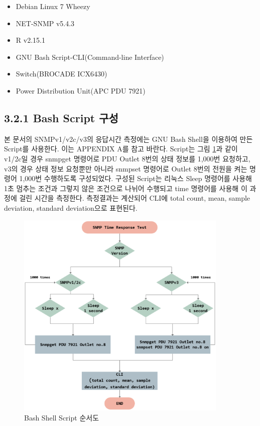\documentclass[11pt
  , a4paper
  , article
  , oneside
]{memoir}
\begin{document}
\begin{itemize}
\item Debian Linux 7 Wheezy
\item NET-SNMP v5.4.3
\item R v2.15.1
\item GNU Bash Script-CLI(Command-line Interface) 
\item Switch(BROCADE ICX6430)
\item Power Distribution Unit(APC PDU 7921)
\end{itemize}

\subsection{3.2.1 Bash Script 구성}
본 문서의 SNMPv1/v2c/v3의 응답시간 측정에는 GNU Bash Shell을 이용하여 만든 Script를 사용한다. 이는 APPENDIX A를 참고 바란다. Script는 그림 \ref{fig:shellscript}과 같이 v1/2c일 경우 snmpget 명령어로 PDU Outlet 8번의 상태 정보를 1,000번 요청하고, v3의 경우 상태 정보 요청뿐만 아니라 snmpset 명령어로 Outlet 8번의 전원을 켜는 명령어 1,000번 수행하도록 구성되었다. 구성된 Script는 리눅스 Sleep 명령어를 사용해 1초 멈추는 조건과 그렇지 않은 조건으로 나뉘어 수행되고 time 명령어를 사용해 이 과정에 걸린 시간을 측정한다. 측정결과는 계산되어 CLI에 total count, mean, sample deviation, standard deviation으로 표현된다. 

\begin{figure}[!htb]
  \centering
  \includegraphics[width=0.9\textwidth]{./images/bashshelscript.eps}
  \caption{Bash Shell Script 순서도 }
  \label{fig:shellscript}   
\end{figure}
\end{document}
